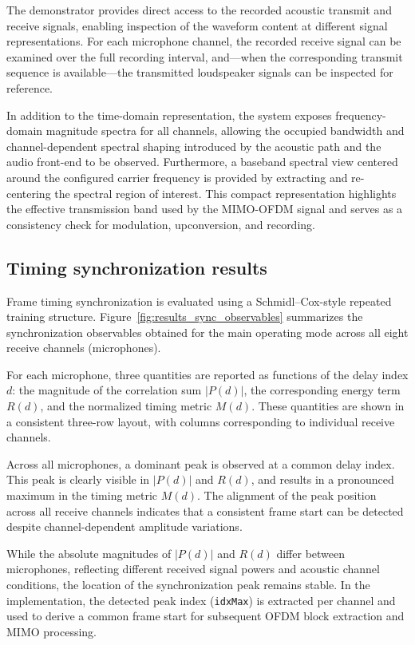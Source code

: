The demonstrator provides direct access to the recorded acoustic transmit and
receive signals, enabling inspection of the waveform content at different
signal representations. For each microphone channel, the recorded receive
signal can be examined over the full recording interval, and—when the
corresponding transmit sequence is available—the transmitted loudspeaker
signals can be inspected for reference.

In addition to the time-domain representation, the system exposes
frequency-domain magnitude spectra for all channels, allowing the occupied
bandwidth and channel-dependent spectral shaping introduced by the acoustic
path and the audio front-end to be observed. Furthermore, a baseband spectral
view centered around the configured carrier frequency is provided by
extracting and re-centering the spectral region of interest. This compact
representation highlights the effective transmission band used by the
MIMO-OFDM signal and serves as a consistency check for modulation,
upconversion, and recording.


\subsection{Timing synchronization results}
\label{sec:results_sync}

Frame timing synchronization is evaluated using a Schmidl--Cox-style repeated
training structure. Figure~\ref{fig:results_sync_observables} summarizes the
synchronization observables obtained for the main operating mode across all
eight receive channels (microphones).

For each microphone, three quantities are reported as functions of the delay
index $d$: the magnitude of the correlation sum $|P(d)|$, the corresponding
energy term $R(d)$, and the normalized timing metric $M(d)$. These quantities
are shown in a consistent three-row layout, with columns corresponding to
individual receive channels.

Across all microphones, a dominant peak is observed at a common delay index.
This peak is clearly visible in $|P(d)|$ and $R(d)$, and results in a pronounced
maximum in the timing metric $M(d)$. The alignment of the peak position across
all receive channels indicates that a consistent frame start can be detected
despite channel-dependent amplitude variations.

While the absolute magnitudes of $|P(d)|$ and $R(d)$ differ between microphones,
reflecting different received signal powers and acoustic channel conditions,
the location of the synchronization peak remains stable. In the implementation,
the detected peak index (\texttt{idxMax}) is extracted per channel and used to
derive a common frame start for subsequent OFDM block extraction and MIMO
processing.

